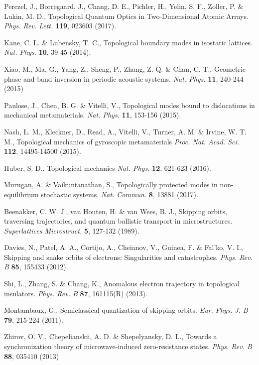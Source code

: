 \documentclass[12pt]{iopart}
\begin{document}
\begin{thebibliography}{10}
		Perczel, J., Borregaard, J., Chang, D. E., Pichler, H., Yelin, S. F., Zoller, P. \& Lukin, M. D.,
		Topological Quantum Optics in Two-Dimensional Atomic Arrays.
		{\it Phys. Rev. Lett.} {\bfseries 119}, 023603 (2017).

		Kane, C. L. \& Lubensky, T. C.,
		Topological boundary modes in isostatic lattices.
		{\it Nat. Phys.} {\bf 10}, 39-45 (2014).

		Xiao, M., Ma, G., Yang, Z., Sheng, P., Zhang, Z. Q. \& Chan, C. T.,	
		Geometric phase and band inversion in periodic acoustic systems.
		{\it Nat. Phys.} {\bfseries 11}, 240-244 (2015)

		Paulose, J., Chen, B. G. \&  Vitelli, V.,
		Topological modes bound to dislocations in mechanical metamaterials. 
		{\it Nat. Phys.} {\bf 11}, 153-156 (2015).

		Nash, L. M., Kleckner, D., Read, A., Vitelli, V., Turner, A. M. \&  Irvine,  W. T. M.,
		Topological mechanics of gyroscopic metamaterials
		{\it Proc. Nat. Acad. Sci.} {\bfseries 112}, 14495-14500  (2015).

		Huber, S. D., 
		Topological mechanics
		{\it Nat. Phys.} {\bfseries 12}, 621-623 (2016).

Murugan, A. \&  Vaikuntanathan, S.,
Topologically protected modes in non-equilibrium stochastic systems.
{\it Nat. Commun.} {\bfseries 8}, 13881 (2017). 
        
		Beenakker, C. W. J., van Houten, H.  \&  van Wees, B. J.,
		Skipping orbits, traversing trajectories, and quantum ballistic transport in microstructures. 
		{\it Superlattices Microstruct.} {\bf 5}, 127-132 (1989).

		Davies, N., Patel, A. A., Cortijo, A., Cheianov, V., Guinea, F. \& Fal'ko, V. I.,
		Skipping and snake orbits of electrons: Singularities and catastrophes.
		{\it Phys. Rev. B} {\bf 85}, 155433 (2012).

		Shi, L., Zhang, S. \& Chang, K.,
		Anomalous electron trajectory in topological insulators.
		{\it Phys. Rev. B} {\bf 87}, 161115(R) (2013).

		Montambaux, G.,
		Semiclassical quantization of skipping orbits.
	{\it Eur. Phys. J. B} {\bf 79}, 215-224 (2011).
        

              


		Zhirov, O. V., Chepelianskii, A. D. \&  Shepelyansky, D. L.,
		Towards a synchronization theory of microwave-induced zero-resistance states.
		{\it Phys. Rev. B} {\bf 88}, 035410 (2013)


\end{thebibliography}
\end{document}
